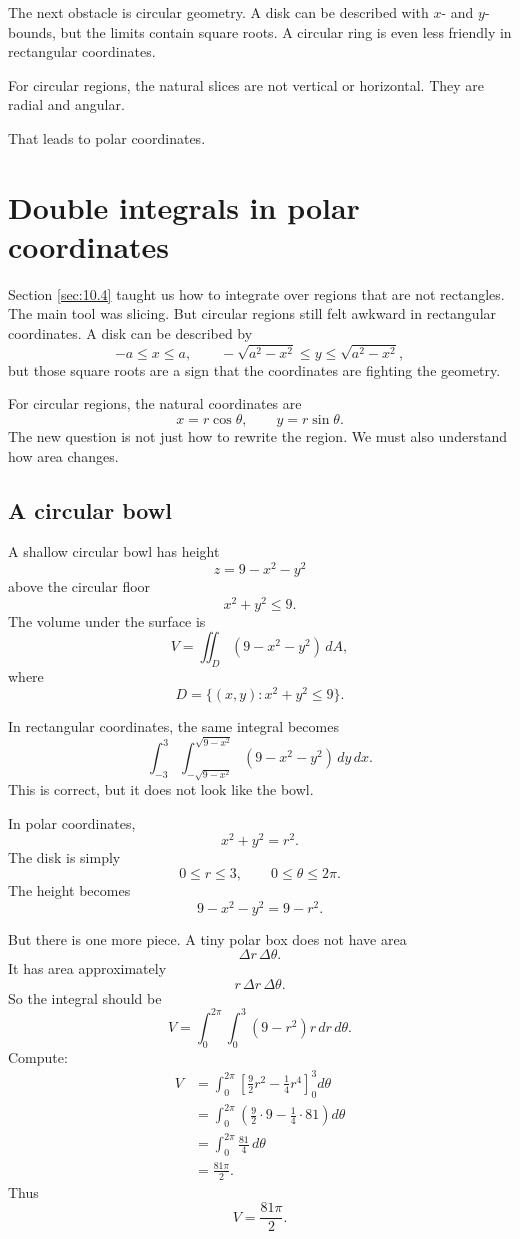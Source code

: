 The next obstacle is circular geometry.  A disk can be described with \(x\)- and
\(y\)-bounds, but the limits contain square roots.  A circular ring is even less friendly in
rectangular coordinates.

For circular regions, the natural slices are not vertical or horizontal.  They are radial
and angular.

That leads to polar coordinates.

\section{Double integrals in polar coordinates}
\label{sec:10.5}

Section \ref{sec:10.4} taught us how to integrate over regions that are not rectangles.
The main tool was slicing.  But circular regions still felt awkward in rectangular
coordinates.  A disk can be described by
\[
    -a\le x\le a,
    \qquad
    -\sqrt{a^2-x^2}\le y\le \sqrt{a^2-x^2},
\]
but those square roots are a sign that the coordinates are fighting the geometry.

For circular regions, the natural coordinates are
\[
    x=r\cos\theta,
    \qquad
    y=r\sin\theta.
\]
The new question is not just how to rewrite the region.  We must also understand how
area changes.

\subsection{A circular bowl}

A shallow circular bowl has height
\[
    z=9-x^2-y^2
\]
above the circular floor
\[
    x^2+y^2\le 9.
\]
The volume under the surface is
\[
    V=\iint_D (9-x^2-y^2)\,dA,
\]
where
\[
    D=\{(x,y):x^2+y^2\le9\}.
\]

In rectangular coordinates, the same integral becomes
\[
    \int_{-3}^{3}
    \int_{-\sqrt{9-x^2}}^{\sqrt{9-x^2}}
    (9-x^2-y^2)\,dy\,dx.
\]
This is correct, but it does not look like the bowl.

In polar coordinates,
\[
    x^2+y^2=r^2.
\]
The disk is simply
\[
    0\le r\le3,
    \qquad
    0\le\theta\le2\pi.
\]
The height becomes
\[
    9-x^2-y^2=9-r^2.
\]

But there is one more piece.  A tiny polar box does not have area
\[
    \Delta r\,\Delta\theta.
\]
It has area approximately
\[
    r\,\Delta r\,\Delta\theta.
\]
So the integral should be
\[
    V=
    \int_0^{2\pi}\int_0^3 (9-r^2)r\,dr\,d\theta.
\]
Compute:
\[
\begin{aligned}
    V
    &=
    \int_0^{2\pi}
    \left[
        \frac92r^2-\frac14r^4
    \right]_0^3
    d\theta \\
    &=
    \int_0^{2\pi}
    \left(
        \frac92\cdot9-\frac14\cdot81
    \right)
    d\theta\\
    &=
    \int_0^{2\pi}
    \frac{81}{4}\,d\theta\\
    &=
    \frac{81\pi}{2}.
\end{aligned}
\]
Thus
\[
\boxed{
    V=\frac{81\pi}{2}.
}
\]

